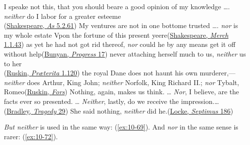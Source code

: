 \ea \label{ex:10-62}
\ea
I speake not this, that you should beare a good opinion of my knowledge {\dots}. \emph{neither} do I labor for a greater esteeme\\\hfill(\href{https://internetshakespeare.uvic.ca/doc/AYL_F1/scene/5.2/index.html#tln-2460}{Shakespeare, \textit{As} 5.2.61})
\ex
My ventures are not in one bottome trusted {\dots}. \emph{nor} is my whole estate Vpon the fortune of this present yeere\hfill(\href{https://internetshakespeare.uvic.ca/doc/MV_F1/scene/index.html#tln-45}{Shakespeare, \textit{Merch} 1.1.43})
\ex
as yet he had not got rid thereof, \emph{nor} could he by any means get it off without help\hfill(\href{https://archive.org/details/bunyanspilgrims00moffgoog/page/36/mode/2up?q=%22got+rid+thereof%22&view=theater}{Bunyan, \textit{Progress} 17})
\ex
never attaching herself much to us, \emph{neither} us to her\\\hfill(\href{https://archive.org/details/praeterita01rusk/page/120/mode/2up?view=theater&q=%22never+attaching+herself%22}{Ruskin, \textit{Præterita} 1.120})
\ex
the royal Dane does not haunt his own murderer,---\emph{neither} does Arthur, King John; \emph{neither} Norfolk, King Richard II.; \emph{nor} Tybalt, Romeo\hfill(\href{https://archive.org/details/ruskinasliterary0000rusk/page/74/mode/2up?q=%22royal+dane+does+not+haunt%22&view=theater}{Ruskin, \textit{Fors}}) %
\ex
Nothing, again, makes us think. {\dots} \emph{Nor}, I believe, are the facts ever so presented. {\dots} \emph{Neither}, lastly, do we receive the impression.{\dots}\\\hfill(\href{https://archive.org/details/shakespeareantra1905brad/page/28/mode/2up?q=%22facts+ever+so+presented%22&view=theater}{Bradley, \textit{Tragedy} 29}) %
\ex
She said nothing, \emph{neither} did he.\hfill(\href{https://archive.org/details/septimus00unkngoog/page/n181/mode/2up?q=%22she+said+nothing%22&view=theater}{Locke, \textit{Septimus} 186})
\z
\z

\textit{But neither} is used in the same way: (\ref{ex:10-69}). And \textit{nor} in the same sense is rarer: (\ref{ex:10-72}).

